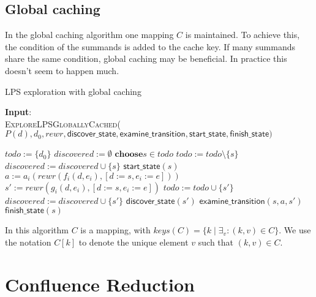 \documentclass{article}
\newcommand{\concat}{\ensuremath{+\!\!+\:}}
\begin{document}
\subsection{Global caching}
In the global caching algorithm one mapping $C$ is maintained. To achieve this, the condition of the summands is added to the cache key. If many summands share the same condition, global caching may be beneficial. In practice this doesn't seem to happen much.

\begin{algorithm}
\small
\caption{LPS exploration with global caching}
\vspace*{1ex}
{\textbf{Input}:} \\
\textsc{ExploreLPSGloballyCached}($P(d), d_0, rewr, \textsf{discover\_state}, \textsf{examine\_transition}, \textsf{start\_state}, \textsf{finish\_state})$
\begin{algorithmic}[1]
\State $todo := \{d_0\}$
\State $discovered := \emptyset$
\State {}
  \State {}
\EndFor
{}
  \State $\textbf{choose} s \in todo$
  \State $todo := todo \setminus \{s\}$
  \State $discovered := discovered \cup \{s\}$
  \State $\textsf{start\_state}(s)$
    \State \colored{$key := c_i(d,e_i) \concat \gamma_i[d:=s]$}
      \State {}
    \Else  
      \State {}
      \State {}
    \EndIf  
      \State $a := a_i(rewr(f_i(d,e_i), [d:=s,e_i:=e]))$
      \State $s' := rewr(g_i(d,e_i), [d:=s,e_i:=e])$
        \State $todo := todo \cup \{ s' \}$
        \State $discovered := discovered \cup \{s'\}$
        \State $\textsf{discover\_state}(s')$
      \EndIf
      \State $\textsf{examine\_transition}(s, a, s')$
    \EndFor
  \EndFor
  \State $\textsf{finish\_state}(s)$
\EndWhile
\end{algorithmic}
\end{algorithm}

In this algorithm $C$ is a mapping, with $keys(C) = \{ k \mid \exists_{v}: (k,v) \in C \}$. We use the notation $C[k]$ to denote the unique element $v$ such that $(k,v) \in C$.

\newpage
\section{Confluence Reduction}
\end{document}
